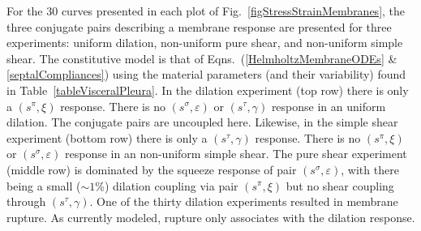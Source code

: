 For the 30 curves presented in each plot of Fig.~\ref{figStressStrainMembranes}, the three conjugate pairs describing a membrane response are presented for three experiments: uniform dilation, non-uniform pure shear, and non-uniform simple shear.  The constitutive model is that of Eqns.~(\ref{HelmholtzMembraneODEs} \& \ref{septalCompliances}) using the material parameters (and their variability) found in Table~\ref{tableVisceralPleura}.  In the dilation experiment (top row) there is only a $( s^{\pi} \! , \xi)$ response.  There is no $( s^{\sigma} \! , \varepsilon)$ or $( s^{\tau} \! , \gamma)$ response in an uniform dilation.  The conjugate pairs are uncoupled here.  Likewise, in the simple shear experiment (bottom row) there is only a $( s^{\tau} \! , \gamma)$ response.  There is no $( s^{\pi} \! , \xi)$ or $( s^{\sigma} \! , \varepsilon)$ response in an non-uniform simple shear.  The pure shear experiment (middle row) is dominated by the squeeze response of pair $( s^{\sigma} \! , \varepsilon)$, with there being a small ($\sim 1$\%) dilation coupling via pair $( s^{\pi} \! , \xi)$ but no shear coupling through $( s^{\tau} \! , \gamma)$.  One of the thirty dilation experiments resulted in membrane rupture.  As currently modeled, rupture only associates with the dilation response.

